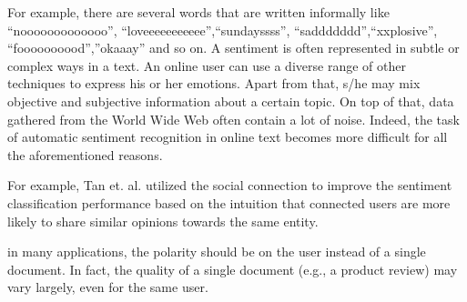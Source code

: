 \documentclass[twocolumn]{svjour3}          %
\begin{document}
For example, there are several words that are written informally like “nooooooooooooo”, “loveeeeeeeeeee”,“sundayssss”, “saddddddd”,“xxplosive”, “foooooooood”,”okaaay” and so on. A sentiment is often represented in subtle or complex ways in a text. An online user can use a diverse range of other techniques to express his or her emotions. Apart from that, s/he may mix objective and subjective information about a certain topic. On top of that, data gathered from the World Wide Web often contain a lot of noise. Indeed, the task of automatic sentiment recognition in online text becomes more difficult for all the aforementioned reasons.

For example, Tan et. al. \cite{tan2011user} utilized the social connection to improve the sentiment classification performance based on the intuition that connected users are more likely to share similar opinions towards the same entity. 

in many applications, the polarity should be on the user instead of a single document. In fact, the quality of a single document (e.g., a product review) may vary largely, even for the same user. \cite{tang2013sentiment}
\end{document}
